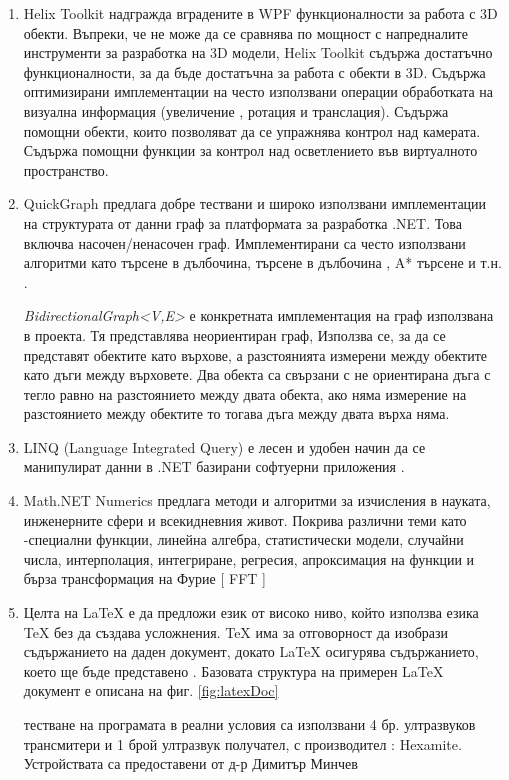 \begin{enumerate}
    \item Helix Toolkit надгражда вградените в WPF функционалности за работа с 3D обекти. Въпреки, че не може да се сравнява по мощност с напредналите инструменти за разработка на 3D модели, Helix Toolkit съдържа достатъчно функционалности, за да бъде достатъчна за работа с обекти в 3D. Съдържа оптимизирани имплементации на често използвани операции обработката на визуална информация (увеличение , ротация и транслация). Съдържа помощни обекти, които позволяват да се упражнява контрол над камерата. Съдържа помощни функции за контрол над осветлението във виртуалното пространство. \cite{helix}
    
    \item QuickGraph предлага добре тествани и широко използвани имплементации на структурата от данни граф за платформата за разработка .NET. Това включва насочен/ненасочен граф. Имплементирани са често използвани алгоритми като търсене в дълбочина, търсене в дълбочина , A* търсене и т.н. \cite{quickgraph}.
    
    \textit{BidirectionalGraph<V,E>} е конкретната имплементация на граф използвана в проекта.  Тя представлява неориентиран граф, Използва се, за да се представят обектите като върхове, а разстоянията измерени между обектите като дъги между върховете. Два обекта са свързани с не ориентирана дъга с тегло равно на разстоянието между двата обекта, ако няма измерение на разстоянието между обектите то тогава дъга между двата върха няма.
    
    \item LINQ (Language Integrated Query) е лесен и удобен начин да се манипулират данни в .NET базирани софтуерни приложения \cite{linq}. 
    
    \item Math.NET Numerics предлага методи и алгоритми за изчисления в науката, инженерните сфери и всекидневния живот. Покрива различни теми като -специални функции, линейна алгебра, статистически модели, случайни числа, интерполация, интегриране, регресия, апроксимация на функции и бърза трансформация на Фурие [ FFT ] \cite{numerics}
    
    \item Целта на LaTeX е да предложи език от високо ниво, който използва езика TeX без да създава усложнения. TeX има за отговорност да изобрази съдържанието на даден документ, докато LaTeX осигурява съдържанието, което ще бъде представено \cite{latexWiki}. Базовата структура на примерен LaTeX документ е описана на фиг. \ref{fig:latexDoc}
    
     тестване на програмата в реални условия са използвани 4 бр. ултразвуков трансмитери и 1 брой ултразвук получател, с производител : Hexamite. Устройствата са предоставени от д-р Димитър Минчев

    
\end{enumerate}

